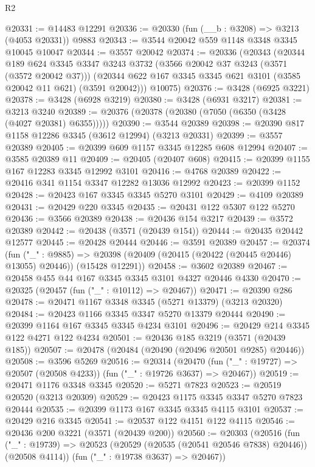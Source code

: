 \begin{lexlean}{R2}
\begin{coremodule}
@20331 := @14483 @12291
@20336 := @20330 (fun (__b : @3208) => @3213 (@4053 @20331)) @9883
@20343 := @3544 @20042 @559 @1148 @3348 @3345 @10045 @10047
@20344 := @3557 @20042
@20374 := @20336
    (@20343
      (@20344
        @189
        @624
        @3345
        @3347
        @3243
        @3732
        (@3566 @20042 @37 @3243 (@3571 (@3572 @20042 @37)))
        (@20344 @622 @167 @3345 @3345 @621 @3101 (@3585 @20042 @11 @621) (@3591 @20042)))
      @10075)
@20376 := @3428 (@6925 @3221)
@20378 := @3428 (@6928 @3219)
@20380 := @3428 (@6931 @3217)
@20381 := @3213 @3240
@20389 := @20376 (@20378 (@20380 (@7050 (@6350 (@3428 (@4027 @20381) @6355)))))
@20390 := @3544 @20389
@20398 := @20390 @817 @1158 @12286 @3345 (@3612 @12994) (@3213 @20331)
@20399 := @3557 @20389
@20405 := @20399 @609 @1157 @3345 @12285 @608 @12994
@20407 := @3585 @20389 @11
@20409 := @20405 (@20407 @608)
@20415 := @20399 @1155 @167 @12283 @3345 @12992 @3101
@20416 := @4768 @20389
@20422 := @20416 @341 @1154 @3347 @12282 @13036 @12992
@20423 := @20399 @1152
@20428 := @20423 @167 @3345 @3345 @5270 @3101
@20429 := @4109 @20389
@20431 := @20429 @220 @3345
@20435 := @20431 @122 @5307 @122 @5270
@20436 := @3566 @20389
@20438 := @20436 @154 @3217
@20439 := @3572 @20389
@20442 := @20438 (@3571 (@20439 @154))
@20444 := @20435 @20442 @12577
@20445 := @20428 @20444
@20446 := @3591 @20389
@20457 := @20374
    (fun ("_" : @9885) =>
    @20398 (@20409 (@20415 (@20422 (@20445 @20446) @13055) @20446)) (@15428 @12291))
@20458 := @3602 @20389
@20467 := @20458 @455 @44 @167 @3345 @3345 @3101 @4327 @20446 @4330
@20470 := @20325 (@20457 (fun ("_" : @10112) => @20467))
@20471 := @20390 @286
@20478 := @20471 @1167 @3348 @3345 (@5271 @13379) (@3213 @20320)
@20484 := @20423 @1166 @3345 @3347 @5270 @13379 @20444
@20490 := @20399 @1164 @167 @3345 @3345 @4234 @3101
@20496 := @20429 @214 @3345 @122 @4271 @122 @4234
@20501 := @20436 @185 @3219 (@3571 (@20439 @185))
@20507 := @20478 (@20484 (@20490 (@20496 @20501 @9285) @20446))
@20508 := @3596 @5269
@20516 := @20314
    (@20470 (fun ("_" : @19727) => @20507 (@20508 @4233)) (fun ("_" : @19726 @3637) => @20467))
@20519 := @20471 @1176 @3348 @3345
@20520 := @5271 @7823
@20523 := @20519 @20520 (@3213 @20309)
@20529 := @20423 @1175 @3345 @3347 @5270 @7823 @20444
@20535 := @20399 @1173 @167 @3345 @3345 @4115 @3101
@20537 := @20429 @216 @3345
@20541 := @20537 @122 @4151 @122 @4115
@20546 := @20436 @200 @3221 (@3571 (@20439 @200))
@20560 := @20303
    (@20516
      (fun ("_" : @19739) => @20523 (@20529 (@20535 (@20541 @20546 @7838) @20446)) (@20508 @4114))
      (fun ("_" : @19738 @3637) => @20467))

\end{coremodule}
\end{lexlean}
